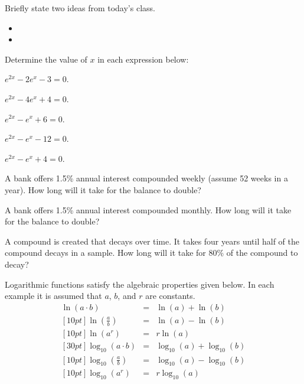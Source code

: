 \begin{problem}
\item Briefly state two ideas from today's class.
  \begin{itemize}
  \item 
  \item 
  \end{itemize}
\item Determine the value of $x$ in each expression below:
  \begin{subproblem}
  \item $e^{2x} - 2 e^{x} - 3 = 0$.
  \item $e^{2x} - 4 e^{x} + 4 = 0$.
  \item $e^{2x} -   e^{x} + 6 = 0$.
  \item $e^{2x} -   e^{x} - 12 = 0$.
  \item $e^{2x} - e^{x} + 4 = 0$.
  \end{subproblem}
\item A bank offers 1.5\% annual interest compounded weekly (assume 52
  weeks in a year). How long will it take for the balance to double?
\item A bank offers 1.5\% annual interest compounded monthly. How long
  will it take for the balance to double?
\item A compound is created that decays over time. It takes four years
  until half of the compound decays in a sample. How long will it take
  for 80\% of the compound to decay?
\end{problem}




Logarithmic functions satisfy the algebraic properties given below. In
each example it is assumed that $a$, $b$, and $r$ are constants. 
\begin{eqnarray}
  \ln(a\cdot b) & = & \ln(a) + \ln(b) \\ [10pt]
  \ln\left(\frac{a}{b}\right) & = & \ln(a) - \ln(b) \\  [10pt]
  \ln\left(a^r\right) & = & r \ln(a) \\ [30pt]
  \log_{10}(a\cdot b) & = & \log_{10}(a) + \log_{10}(b) \\ [10pt]
  \log_{10}\left(\frac{a}{b}\right) & = & \log_{10}(a) - \log_{10}(b) \\  [10pt]
  \log_{10}\left(a^r\right) & = & r \log_{10}(a)
\end{eqnarray}



